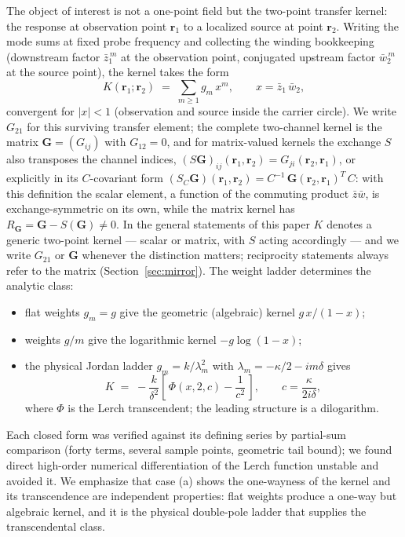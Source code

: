 \documentclass[11pt,a4paper]{article}
\newcommand{\zb}{\bar{z}}
\newcommand{\wb}{\bar{w}}
\newcommand{\zbone}{\bar{z}_1}
\newcommand{\wbtwo}{\bar{w}_2}
\begin{document}
The object of interest is not a one-point field but the two-point transfer
kernel: the response at observation point $\mathbf{r}_1$ to a localized source at
point $\mathbf{r}_2$. Writing the mode sums at fixed probe frequency and
collecting the winding bookkeeping (downstream factor $\zbone^{\,m}$ at the
observation point, conjugated upstream factor $\wbtwo^{\,m}$ at the source
point), the kernel takes the form
\begin{equation}
K(\mathbf{r}_1;\mathbf{r}_2) \;=\; \sum_{m \geq 1} g_m\, x^m,
\qquad x = \zbone\,\wbtwo,
\label{eq:kernelsum}
\end{equation}
convergent for $|x| < 1$ (observation and source inside the carrier circle).
We write $G_{21}$ for this surviving transfer element; the complete
two-channel kernel is the matrix $\mathbf{G} = (G_{ij})$ with $G_{12} = 0$,
and for matrix-valued kernels the exchange $S$ also transposes the channel
indices,
$(S \mathbf{G})_{ij}(\mathbf{r}_1, \mathbf{r}_2) = G_{ji}(\mathbf{r}_2,
\mathbf{r}_1)$, or explicitly in its $C$-covariant form
$(S_C \mathbf{G})(\mathbf{r}_1, \mathbf{r}_2) = C^{-1}\,
\mathbf{G}(\mathbf{r}_2, \mathbf{r}_1)^{T}\, C$: with this definition the
scalar element, a function of the commuting product $\zb\wb$, is
exchange-symmetric on its own, while the matrix kernel has
$R_{\mathbf{G}} = \mathbf{G} - S(\mathbf{G}) \neq 0$. In the general
statements of this paper $K$ denotes a generic two-point kernel --- scalar or
matrix, with $S$ acting accordingly --- and we write $G_{21}$ or $\mathbf{G}$
whenever the distinction matters; reciprocity statements always refer to the
matrix (Section~\ref{sec:mirror}). The
weight ladder determines the analytic class:
\begin{itemize}
\item[(a)] flat weights $g_m = g$ give the geometric (algebraic) kernel
  $g\,x/(1 - x)$;
\item[(b)] weights $g/m$ give the logarithmic kernel $-g \log(1 - x)$;
\item[(c)] the physical Jordan ladder $g_m = k / \lambda_m^2$ with
  $\lambda_m = -\kappa/2 - i m \delta$ gives
  \begin{equation}
  K \;=\; -\frac{k}{\delta^{2}} \left[\, \Phi(x, 2, c) - \frac{1}{c^{2}} \,\right],
  \qquad c = \frac{\kappa}{2 i \delta},
  \label{eq:lerch}
  \end{equation}
  where $\Phi$ is the Lerch transcendent; the leading structure is a
  dilogarithm.
\end{itemize}
Each closed form was verified against its defining series by partial-sum
comparison (forty terms, several sample points, geometric tail bound); we found
direct high-order numerical differentiation of the Lerch function unstable and
avoided it. We emphasize that case (a) shows the one-wayness of the kernel and
its transcendence are independent properties: flat weights produce a one-way
but algebraic kernel, and it is the physical double-pole ladder that supplies
the transcendental class.
\end{document}
